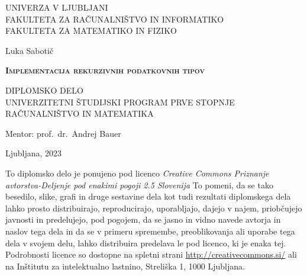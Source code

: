 \documentclass[12pt,a4paper,openany]{book}
\begin{document}
\frontmatter
\setcounter{page}{1} %
\renewcommand{\thepage}{}  
\thispagestyle{empty} 

\begin{center}
{\large 
UNIVERZA V LJUBLJANI\\
FAKULTETA ZA RAČUNALNIŠTVO IN INFORMATIKO\\
FAKULTETA ZA MATEMATIKO IN FIZIKO\\
}

\vspace{3cm}
{\LARGE Luka Sabotič}\\

\vspace{2cm}
{\LARGE
\textsc{\textbf{Implementacija rekurzivnih podatkovnih tipov}}\par}

\vspace{2cm}
{ DIPLOMSKO DELO}\\
{ UNIVERZITETNI ŠTUDIJSKI PROGRAM PRVE STOPNJE
RAČUNALNIŠTVO IN MATEMATIKA\\
}

\vspace{2cm} 
{\Large Mentor: prof.\ dr.\ Andrej Bauer}

\vfill
{\Large Ljubljana, 2023}
\end{center}

\newpage


\thispagestyle{empty}

\vspace*{5cm}
{\small \noindent
To diplomsko delo je ponujeno pod licenco \textit{Creative Commons Priznanje avtorstva-Deljenje pod enakimi pogoji 2.5 Slovenija}
To pomeni, da se tako besedilo, slike, grafi in druge sestavine dela kot tudi rezultati diplomskega dela lahko prosto distribuirajo,
reproducirajo, uporabljajo, dajejo v najem, priobčujejo javnosti in predelujejo, pod pogojem, da se jasno in vidno navede avtorja in naslov tega
dela in da se v primeru spremembe, preoblikovanja ali uporabe tega dela v svojem delu, lahko distribuira predelava le pod
licenco, ki je enaka tej.
Podrobnosti licence so dostopne na spletni strani \url{http://creativecommons.si/} ali na Inštitutu za
intelektualno lastnino, Streliška 1, 1000 Ljubljana.

\begin{center}%
  \hspace*{1ex}
\end{center}
}
\end{document}
